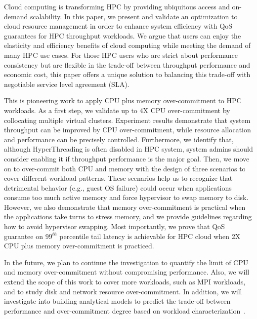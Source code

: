 Cloud computing is transforming
HPC by providing ubiquitous access and on-demand scalability. %
In this paper, 
we present and validate an optimization to cloud resource management in order to enhance system efficiency with QoS guarantees for HPC throughput workloads. We argue that users can enjoy the elasticity and efficiency benefits of cloud computing while meeting the demand of many HPC 
use cases. For those HPC users who are strict about performance consistency but are flexible 
in the trade-off between throughput performance and economic cost, this paper offers a unique 
solution to balancing this trade-off with negotiable service level agreement (SLA). 

This is pioneering work to apply CPU plus memory 
over-commitment to HPC workloads. %
As a first step, we validate up to 4X CPU over-commitment by collocating  
multiple virtual clusters. Experiment results demonstrate that system 
throughput can be improved by CPU over-commitment, while resource allocation and performance can be 
precisely controlled. %
Furthermore, we identify that, although HyperThreading is often disabled in HPC system, system admins should consider 
enabling it if throughput performance is the major goal. Then, we move on to over-commit 
both CPU and memory with the design of three scenarios to cover different workload patterns. These 
scenarios help us to recognize that detrimental behavior (e.g., guest OS failure) could occur when 
applications consume too much active memory and force hypervisor to swap memory to disk. However, 
we also demonstrate that memory over-commitment is practical when the applications take turns to 
stress memory, and we provide guidelines regarding how to avoid hypervisor swapping. Most importantly, 
we prove that QoS guarantee on $99^{th}$ percentile tail latency is achievable for HPC cloud 
when 2X CPU plus memory 
over-commitment is practiced. 

In the future, 
we plan to continue the investigation to quantify the limit of CPU and memory over-commitment without 
compromising performance. Also, we will 
extend the scope of this work to cover more workloads, such as MPI workloads, and to study disk and network resource over-commitment. In addition, we will investigate into building 
analytical models to predict the trade-off between performance and over-commitment degree based on 
workload characterization~\cite{arlitt1997internet,234855}. 